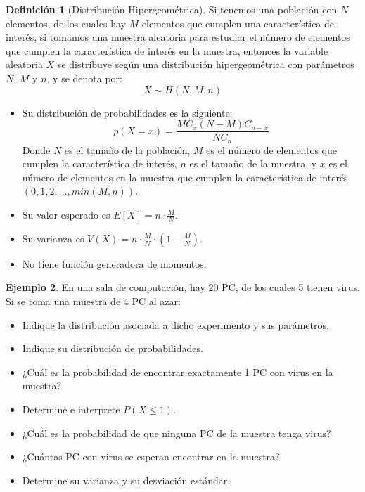 \documentclass{article}
\theoremstyle{definition}
\newtheorem{definition}{Definición}[section]
\newtheorem{example}[definition]{Ejemplo}
\theoremstyle{plain}
\theoremstyle{remark}
\begin{document}
\begin{definition}[Distribución Hipergeométrica]
Si tenemos una población con $N$ elementos, de los cuales hay $M$ elementos que cumplen una característica de interés, si tomamos una muestra aleatoria para estudiar el número de elementos que cumplen la característica de interés en la muestra, entonces la variable aleatoria $X$ se distribuye según una distribución hipergeométrica con parámetros $N$, $M$ y $n$, y se denota por:
\[
X \sim H(N, M, n)
\]

\begin{itemize}
\item Su distribución de probabilidades es la siguiente:
\[
p(X = x) = \frac{M C_x (N - M) C_{n - x}}{N C_n}
\]
Donde $N$ es el tamaño de la población, $M$ es el número de elementos que cumplen la característica de interés, $n$ es el tamaño de la muestra, y $x$ es el número de elementos en la muestra que cumplen la característica de interés $(0, 1, 2, ..., min(M, n))$.
\item Su valor esperado es $E[X] = n \cdot \frac{M}{N}$.
\item Su varianza es $V(X) = n \cdot \frac{M}{N} \cdot (1 - \frac{M}{N})$.
\item No tiene función generadora de momentos.
\end{itemize}

\end{definition}

\begin{example}
En una sala de computación, hay 20 PC, de los cuales 5 tienen virus. Si se toma una muestra de 4 PC al azar:

\begin{itemize}
\item Indique la distribución asociada a dicho experimento y sus parámetros.
\item Indique su distribución de probabilidades.
\item ¿Cuál es la probabilidad de encontrar exactamente 1 PC con virus en la muestra?
\item Determine e interprete $P(X \leq 1)$.
\item ¿Cuál es la probabilidad de que ninguna PC de la muestra tenga virus?
\item ¿Cuántas PC con virus se esperan encontrar en la muestra?
\item Determine su varianza y su desviación estándar.
\end{itemize}

\end{example}
\end{document}
